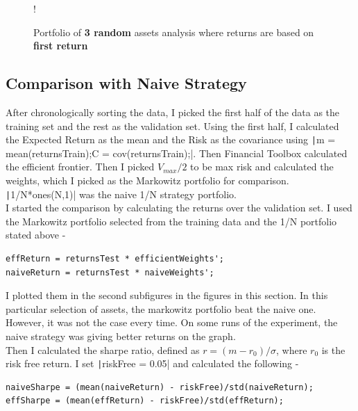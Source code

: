 \documentclass[11pt]{article}
\begin{document}
\begin{figure}[!h]
   \centering 
 	\resizebox {\textwidth} {!} { }
    \caption{Portfolio of \textbf{3 random} assets analysis where returns are based on \textbf{first return}}
	\label{fig:q2-all-based-on-first}
	\vspace{-0.5cm}
\end{figure}

\subsection{Comparison with Naive Strategy}

After chronologically sorting the data, I picked the first half of the data as the training set and the
rest as the validation set. Using the first half, I calculated the Expected Return as the mean and the
Risk as the covariance using \texttt|m = mean(returnsTrain);C = cov(returnsTrain);|. Then
Financial Toolbox calculated the efficient frontier. Then I picked $V_{max}/2$ to be max risk 
and calculated the weights, which I picked as the Markowitz portfolio for comparison. 
\texttt|1/N*ones(N,1)| was the naive 1/N strategy portfolio.\\

I started the comparison by calculating the returns over the validation set. I used the Markowitz
portfolio selected from the training data and the 1/N portfolio stated above -

\begin{verbatim}
effReturn = returnsTest * efficientWeights';
naiveReturn = returnsTest * naiveWeights';
\end{verbatim}

I plotted them in the second subfigures in the figures in this section. In this particular
selection of assets, the markowitz portfolio beat the naive one. However, it was not the case every time.
On some runs of the experiment, the naive strategy was giving better returns on the graph.\\

Then I calculated the sharpe ratio, defined as $r = (m - r_0)/\sigma$, where $r_0$ is the risk free return.
I set \texttt|riskFree = 0.05| and calculated the following -

\begin{verbatim}
naiveSharpe = (mean(naiveReturn) - riskFree)/std(naiveReturn);
effSharpe = (mean(effReturn) - riskFree)/std(effReturn);
\end{verbatim}
\end{document}
